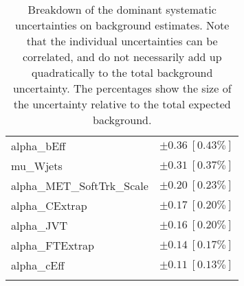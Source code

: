 \begin{table}
\begin{center}
\begin{tabular*}{\textwidth}{@{\extracolsep{\fill}}lc}
alpha\_bEff         & $\pm 0.36\ [0.43\%] $       \\
mu\_Wjets         & $\pm 0.31\ [0.37\%] $       \\
alpha\_MET\_SoftTrk\_Scale         & $\pm 0.20\ [0.23\%] $       \\
alpha\_CExtrap         & $\pm 0.17\ [0.20\%] $       \\
alpha\_JVT         & $\pm 0.16\ [0.20\%] $       \\
alpha\_FTExtrap         & $\pm 0.14\ [0.17\%] $       \\
alpha\_cEff         & $\pm 0.11\ [0.13\%] $       \\
\noalign{\smallskip}\hline\noalign{\smallskip}
\end{tabular*}
\end{center}
\caption[Breakdown of uncertainty on background estimates]{
Breakdown of the dominant systematic uncertainties on background estimates.
Note that the individual uncertainties can be correlated, and do not necessarily add up quadratically to 
the total background uncertainty. The percentages show the size of the uncertainty relative to the total expected background.
\label{table.results.bkgestimate.uncertainties.VRTopE}}
\end{table}
%